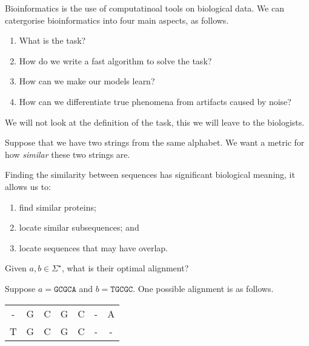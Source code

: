 
Bioinformatics is the use of computatinoal tools on biological data.
We can catergorise bioinformatics into four main aspects, as follows.
\begin{enumerate}
	\item What is the task?
	\item How do we write a fast algorithm to solve the task?
	\item How can we make our models learn?
	\item How can we differentiate true phenomena from artifacts
		caused by noise?
\end{enumerate}

We will not look at the definition of the task,
this we will leave to the biologists.

\begin{example}
	Suppose that we have two strings from the same alphabet.
	We want a metric for how \emph{similar} these two strings are.
\end{example}


Finding the similarity between sequences has significant biological meaning,
it allows us to:
\begin{enumerate}
	\item find similar proteins;
	\item locate similar subsequences; and
	\item locate sequences that may have overlap.
\end{enumerate}

\begin{problem}
	Given $a, b \in \Sigma^\star$,
	what is their optimal alignment?
\end{problem}

\begin{example}[]
	Suppose $a = \mathtt{GCGCA}$ and $b = \mathtt{TGCGC}$.
	One possible alignment is as follows.
	\begin{center}
		\ttfamily
		\begin{tabular}{ccccccc}
			- & G & C & G & C & - & A \\
			T & G & C & G & C & - & -
		\end{tabular}
	\end{center}
\end{example}

